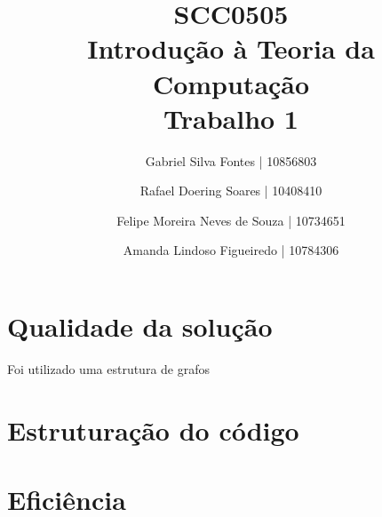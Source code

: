 \documentclass[12pt]{article}
\title{SCC0505 \\ Introdução à Teoria da Computação \\ Trabalho 1}
\author{Gabriel Silva Fontes | 10856803
        \and
        Rafael Doering Soares | 10408410
        \and
        Felipe Moreira Neves de Souza | 10734651
        \and
        Amanda Lindoso Figueiredo | 10784306}
\begin{document}
\maketitle
\section{Qualidade da solução}
Foi utilizado uma estrutura de grafos

\section{Estruturação do código}
\section{Eficiência}
\end{document}
